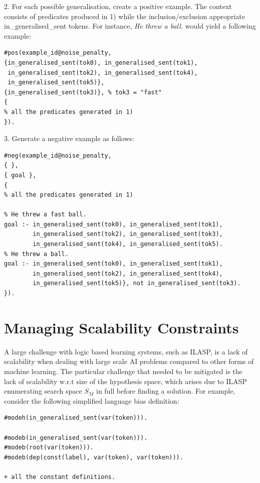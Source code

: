 2. For each possible generalisation, create a positive example. The context consists of predicates produced in 1) while the inclusion/exclusion appropriate in\_generalised\_sent tokens. For instance, \textit{He threw a ball.} would yield a following example:
\begin{verbatim}
#pos(example_id@noise_penalty,
{in_generalised_sent(tok0), in_generalised_sent(tok1), 
 in_generalised_sent(tok2), in_generalised_sent(tok4), 
 in_generalised_sent(tok5)},
{in_generalised_sent(tok3)}, % tok3 = "fast"
{
% all the predicates generated in 1)
}).
\end{verbatim}

3. Generate a negative example as follows:
\begin{verbatim}
#neg(example_id@noise_penalty,
{ },
{ goal },
{
% all the predicates generated in 1)

% He threw a fast ball.
goal :- in_generalised_sent(tok0), in_generalised_sent(tok1), 
        in_generalised_sent(tok2), in_generalised_sent(tok3), 
        in_generalised_sent(tok4), in_generalised_sent(tok5).
% He threw a ball.
goal :- in_generalised_sent(tok0), in_generalised_sent(tok1), 
        in_generalised_sent(tok2), in_generalised_sent(tok4), 
        in_generalised_sent(tok5)}, not in_generalised_sent(tok3).
}).
\end{verbatim}


\section{Managing Scalability Constraints}

A large challenge with logic based learning systems, such as ILASP, is a lack of scalability when dealing with large scale AI problems compared to other forms of machine learning.
The particular challenge that needed to be mitigated is the lack of scalability w.r.t size of the hypothesis space, which arises due to ILASP enumerating search space $S_M$ in full before finding a solution.
For example, consider the following simplified language bias definition:
\begin{verbatim}
#modeh(in_generalised_sent(var(token))).

#modeb(in_generalised_sent(var(token))).
#modeb(root(var(token))).
#modeb(dep(const(label), var(token), var(token))).

+ all the constant definitions.
\end{verbatim}


